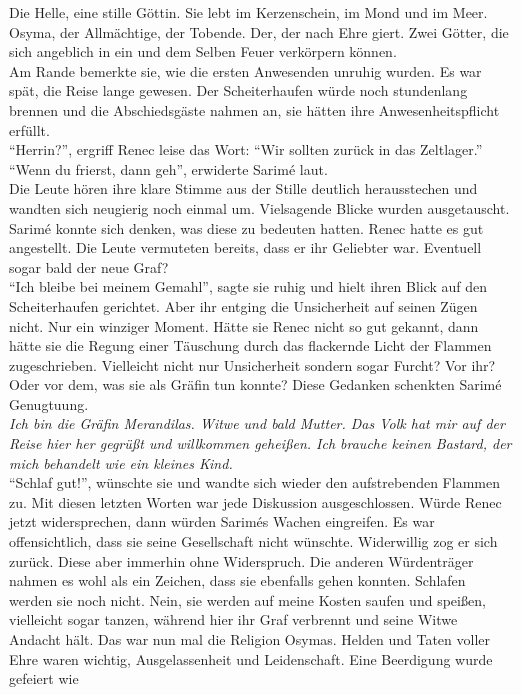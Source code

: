 Die Helle, eine stille Göttin. Sie lebt im Kerzenschein, im Mond und im Meer.  Osyma, der 
Allmächtige, der Tobende. Der, der nach Ehre giert. Zwei Götter, die sich angeblich in ein und dem 
Selben Feuer verkörpern können.\\
Am Rande bemerkte sie, wie die ersten Anwesenden unruhig wurden. Es war spät, die Reise lange 
gewesen. Der Scheiterhaufen würde noch stundenlang brennen und die Abschiedsgäste nahmen an, sie 
hätten ihre Anwesenheitspflicht erfüllt. \\
``Herrin?'', ergriff Renec leise das Wort: ``Wir sollten zurück in das Zeltlager.''\\
``Wenn du frierst, dann geh'', erwiderte Sarimé laut. \\
Die Leute hören ihre klare Stimme aus der Stille deutlich herausstechen und wandten sich neugierig 
noch einmal um. Vielsagende Blicke wurden ausgetauscht. Sarimé konnte sich denken, was diese zu 
bedeuten hatten. Renec hatte es gut angestellt. Die Leute vermuteten bereits, dass er ihr Geliebter 
war. Eventuell sogar bald der neue Graf? \\
``Ich bleibe bei meinem Gemahl'', sagte sie ruhig und hielt ihren Blick auf den Scheiterhaufen 
gerichtet. Aber ihr entging die Unsicherheit auf seinen Zügen nicht. Nur ein winziger Moment. Hätte 
sie Renec nicht so gut gekannt, dann hätte sie die Regung einer Täuschung durch das flackernde 
Licht der Flammen zugeschrieben. Vielleicht nicht nur Unsicherheit sondern sogar Furcht? Vor ihr? 
Oder vor dem, was sie als Gräfin tun konnte? Diese Gedanken schenkten Sarimé Genugtuung. \\
\textit{Ich bin die Gräfin Merandilas. Witwe und bald Mutter. Das Volk hat mir auf der Reise hier 
her gegrüßt und willkommen geheißen. Ich brauche keinen Bastard, der mich behandelt wie ein kleines 
Kind.}\\
``Schlaf gut!'', wünschte sie und wandte sich wieder den aufstrebenden Flammen zu. Mit diesen 
letzten Worten war jede Diskussion ausgeschlossen. Würde Renec jetzt widersprechen, dann würden 
Sarimés Wachen eingreifen. Es war offensichtlich, dass sie seine Gesellschaft nicht wünschte. 
Widerwillig zog er sich zurück. Diese aber immerhin ohne Widerspruch. Die anderen Würdenträger 
nahmen es wohl als ein Zeichen, dass sie ebenfalls gehen konnten. Schlafen werden sie noch nicht. 
Nein, sie werden auf meine Kosten saufen und speißen, vielleicht sogar tanzen, während hier ihr 
Graf verbrennt und seine Witwe Andacht hält. Das war nun mal die Religion Osymas. Helden und Taten 
voller Ehre waren wichtig, Ausgelassenheit und Leidenschaft. Eine Beerdigung wurde gefeiert wie 
